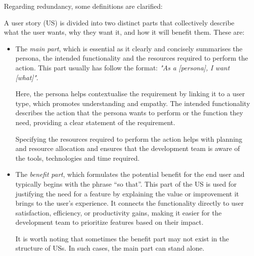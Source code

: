 Regarding redundancy, some definitions are clarified:
\begin{definition}
	A user story (US) is divided into two distinct parts that collectively describe what the user wants, why they want it, and how it will benefit them. These are:
	\begin{itemize}
		\item The \textit{main part}, which is essential as it clearly and concisely summarises the persona, the intended functionality and the resources required to perform the action. This part usually has follow the format: \textit{"As a [persona], I want [what]"}. 
		
		Here, the persona helps contextualise the requirement by linking it to a user type, which promotes understanding and empathy. The intended functionality describes the action that the persona wants to perform or the function they need, providing a clear statement of the requirement.
		
		Specifying the resources required to perform the action helps with planning and resource allocation and ensures that the development team is aware of the tools, technologies and time required.
		
		\item The \textit{benefit part}, which formulates the potential benefit for the end user and typically begins with the phrase \enquote{so that}. This part of the US is used for justifying the need for a feature by explaining the value or improvement it brings to the user's experience. It connects the functionality directly to user satisfaction, efficiency, or productivity gains, making it easier for the development team to prioritize features based on their impact.
		
		It is worth noting that sometimes the benefit part may not exist in the structure of USs. In such cases, the main part can stand alone.
	\end{itemize}
\end{definition}
